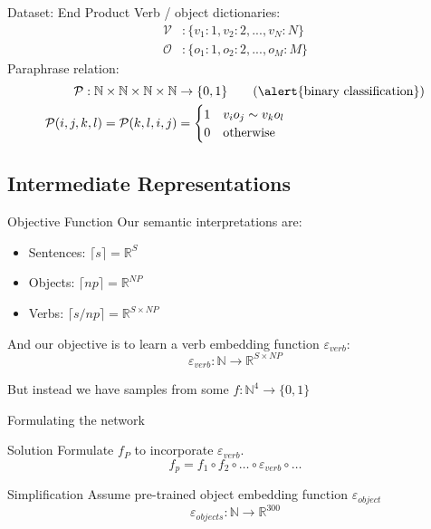 \documentclass{beamer}
\begin{document}
\begin{frame}{Dataset: End Product}
	Verb / object dictionaries:
	\begin{align*}
	\mathcal{V}&: \{v_1: 1, v_2: 2, ..., v_N: N\}\\
	\mathcal{O}&: \{o_1: 1, o_2: 2, ..., o_M: M\}
	\end{align*}
	Paraphrase relation: 
	\begin{align*}
	\mathcal{P}: \mathbb{N} \times \mathbb{N} \times \mathbb{N} \times \mathbb{N} &\to \{0, 1\} \tag{\alert{binary classification}}\\
	\mathcal{P}(i,j,k,l) = \mathcal{P}(k,l,i,j)
	 &= \begin{cases}
	1 & v_i o_j \sim v_k o_l\\
	0 & \text{otherwise}\\
	\end{cases}
	\end{align*}	
\end{frame}
  
\subsection{Intermediate Representations}
  \begin{frame}{Objective Function}
    Our semantic interpretations are:
  	\begin{itemize}
  	\item Sentences: $ \lceil s \rceil = \mathbb{R}^{S}$
  	\item Objects: $ \lceil np \rceil = \mathbb{R}^{NP}$
  	\item Verbs: $\lceil s / np \rceil = \mathbb{R}^{S\times NP}$
  	\end{itemize}
  
  	And our objective is to learn a \alert{verb embedding function} 
  	$\varepsilon_{verb}$:
  	\[
  	\varepsilon_{verb}: \mathbb{N} \to \mathbb{R}^{S\times NP}
  	\]
  	
  	But instead we have samples from some $f: \mathbb{N}^4 \to \{0,1\}$ 
  	

  	
\end{frame}

\begin{frame}{Formulating the network}
  	\begin{block}{Solution}
	Formulate $f_P$ to incorporate $\varepsilon_{verb}$.
	\[
	f_p = f_1 \circ f_2 \circ \dots \circ \varepsilon_{verb} \circ \dots
	\] 
  	\end{block}
  	 
  	\pause
  	\begin{block}{Simplification}
  	Assume pre-trained \alert{object embedding function} $\varepsilon_{object}$
  	\[
  	\varepsilon_{objects}: \mathbb{N} \to \mathbb{R}^{300}
  	\]
  	\end{block}
\end{frame}
\end{document}
